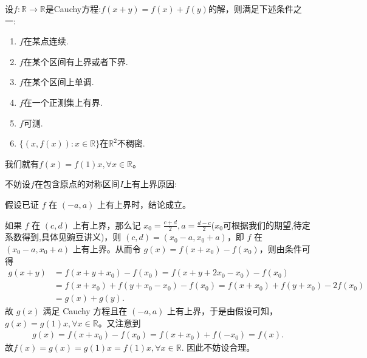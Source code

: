 \documentclass[../../main.tex]{subfiles}%
\begin{document}
\begin{theorem}[Cauchy方程基本定理]\label{theorem:Cauchy方程基本定理}
设\(f:\mathbb{R}\to\mathbb{R}\)是Cauchy方程:$f(x + y)=f(x)+f(y)$的解，则满足下述条件之一:
\begin{enumerate}[(1)]
\item \(f\)在某点连续.

\item  \(f\)在某个区间有上界或者下界.

\item  \(f\)在某个区间上单调.

\item  \(f\)在一个正测集上有界.

\item   \(f\)可测.

\item \(\{(x,f(x)):x\in\mathbb{R}\}\)在\(\mathbb{R}^2\)不稠密.
\end{enumerate}
我们就有\(f(x)=f(1)x,\forall x\in\mathbb{R}\)。
\end{theorem}
\begin{remark}
\hypertarget{不妨设的原因112}{不妨设\(f\)在包含原点的对称区间\(I\)上有上界原因:}假设已证 \(f\) 在 \((-a,a)\) 上有上界时，结论成立。

如果 \(f\) 在 \((c,d)\) 上有上界，那么记 \(x_0 = \frac{c + d}{2},a = \frac{d - c}{2}\)($x_0$可根据我们的期望,待定系数得到,具体见豌豆讲义)，则 \((c,d)=(x_0 - a,x_0 + a)\)，即
\(f\) 在 \((x_0 - a,x_0 + a)\) 上有上界。从而令 \(g(x)=f(x + x_0)-f(x_0)\)，则由条件可得
\begin{align*}
g(x + y)&=f(x + y + x_0)-f(x_0)
=f(x + y + 2x_0 - x_0)-f(x_0)\\
&=f(x + x_0)+f(y + x_0 - x_0)-f(x_0)
=f(x + x_0)+f(y + x_0)-2f(x_0)\\
&=g(x)+g(y).
\end{align*}
故 \(g(x)\) 满足 Cauchy 方程且在 \((-a,a)\) 上有上界，于是由假设可知，\(g(x)=g(1)x,\forall x\in \mathbb{R}\)。又注意到
\begin{align*}
g(x)=f(x+x_0)-f(x_0)=f(x+x_0)+f(-x_0)=f(x).
\end{align*}
故$f(x)=g(x)=g(1)x=f(1)x,\forall x\in\mathbb{R}.$
因此不妨设合理。
\end{remark}
\end{document}

